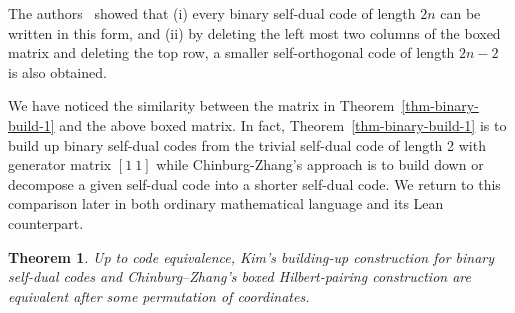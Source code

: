 \documentclass[12pt]{article}
\newtheorem{theorem}{Theorem}[section]
\newenvironment{blueblock}{\begingroup\color{blue}}{\endgroup}
\begin{document}
The authors~\cite{ChinburgZhang} showed that (i) every binary self-dual code of length $2n$ can be written in this form, and (ii) by deleting the left most two columns of the boxed matrix and deleting the top row, a smaller self-orthogonal code of length $2n-2$ is also obtained.

We have noticed the similarity between the matrix in Theorem~\ref{thm-binary-build-1} and the above boxed matrix. In fact, Theorem~\ref{thm-binary-build-1} is to build up binary self-dual codes from the trivial self-dual code of length 2 with generator matrix $[1~ 1]$ while Chinburg-Zhang's approach is to build down or decompose a given self-dual code into a shorter self-dual code.
We return to this comparison later in both ordinary mathematical language and its Lean counterpart.

\begin{theorem}\label{thm:binary-cz-kim}
Up to code equivalence, Kim's building-up construction for binary self-dual codes and Chinburg--Zhang's boxed Hilbert-pairing construction are equivalent after some permutation of coordinates.
\end{theorem}
\end{document}
